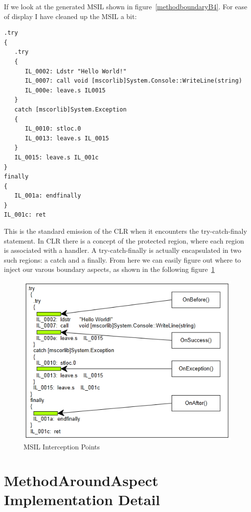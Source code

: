 If we look at the generated MSIL shown in figure~\ref{methodboundaryB4}. For ease of display I have cleaned up the MSIL a bit:

\begin{lstlisting}[caption={MSIL generated for sample C\# function}, label=methodboundaryB4]
.try
{
   .try
   {
      IL_0002: Ldstr "Hello World!"
      IL_0007: call void [mscorlib]System.Console::WriteLine(string)
      IL_000e: leave.s IL0015
   }
   catch [mscorlib]System.Exception
   {
      IL_0010: stloc.0
      IL_0013: leave.s IL_0015
   }
   IL_0015: leave.s IL_001c
}
finally
{
   IL_001a: endfinally
}
IL_001c: ret
\end{lstlisting}

This is the standard emission of the CLR when it encounters the try-catch-finaly statement. In CLR there is a concept of the protected region, where each region is associated with a handler. A try-catch-finally is actually encapsulated in two such regions: a catch and a finally. From here we can easily figure out where to inject our varous boundary aspects, as shown in the following figure~\ref{methodboundary02}

\begin{figure}[H]
  \includegraphics[scale=1.0]{MethodBoundaryOverview.PNG}
  \centering
  \caption{MSIL Interception Points\label{methodboundary02}}
\end{figure}

\section{MethodAroundAspect Implementation Detail}

